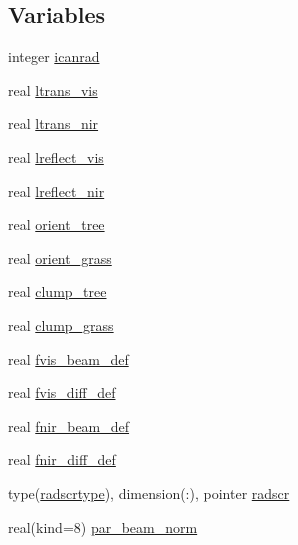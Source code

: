 \subsection*{Variables}
\begin{DoxyCompactItemize}
\item 
integer \hyperlink{namespacecanopy__radiation__coms_a14fc38d8fcab4e07489c6a98d0fa1ec0}{icanrad}
\item 
real \hyperlink{namespacecanopy__radiation__coms_a87104ccbd0550f1c136fa52e924b4757}{ltrans\+\_\+vis}
\item 
real \hyperlink{namespacecanopy__radiation__coms_af7cd19c8b528f9ad44a71f0a35c6ce1d}{ltrans\+\_\+nir}
\item 
real \hyperlink{namespacecanopy__radiation__coms_a93d73e57e54635c41e0ccffe6025ef2f}{lreflect\+\_\+vis}
\item 
real \hyperlink{namespacecanopy__radiation__coms_a10712ab8a7b1bfada454fdfaa9e4a919}{lreflect\+\_\+nir}
\item 
real \hyperlink{namespacecanopy__radiation__coms_a02f343f29bc50bd43ad7a47feca0aeb9}{orient\+\_\+tree}
\item 
real \hyperlink{namespacecanopy__radiation__coms_a9a05bcd1d22939f34bc3b6d2f4464f02}{orient\+\_\+grass}
\item 
real \hyperlink{namespacecanopy__radiation__coms_a56f3277cb77422d513a00732dec93b73}{clump\+\_\+tree}
\item 
real \hyperlink{namespacecanopy__radiation__coms_a4ab5b29df445f0f0c4e230192ad288ba}{clump\+\_\+grass}
\item 
real \hyperlink{namespacecanopy__radiation__coms_ac004366e46d368e0959443f710484ae0}{fvis\+\_\+beam\+\_\+def}
\item 
real \hyperlink{namespacecanopy__radiation__coms_a4b2b1be923f4d3c9c9a60e315391af77}{fvis\+\_\+diff\+\_\+def}
\item 
real \hyperlink{namespacecanopy__radiation__coms_a9cf9456a8e225d5d5cbeeb3c0a3c1d9f}{fnir\+\_\+beam\+\_\+def}
\item 
real \hyperlink{namespacecanopy__radiation__coms_a1d50899df57055efdbfa121479ac3710}{fnir\+\_\+diff\+\_\+def}
\item 
type(\hyperlink{structcanopy__radiation__coms_1_1radscrtype}{radscrtype}), dimension(\+:), pointer \hyperlink{namespacecanopy__radiation__coms_a77faeb46000116eff7d27da31a4ddfde}{radscr}
\item 
real(kind=8) \hyperlink{namespacecanopy__radiation__coms_a0a87e7dadcbbc1c05d9cfb08a7607c0d}{par\+\_\+beam\+\_\+norm}

\end{DoxyCompactItemize}
